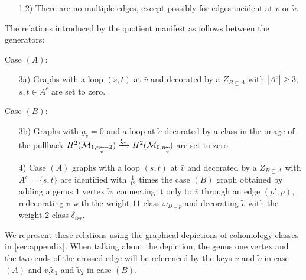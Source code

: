 \begin{enumerate}
    \item[1.2)] There are no multiple edges, except possibly for edges incident at $\bar{v}$ or $\tilde{v}$.
\end{enumerate}

The relations introduced by the quotient manifest as follows between the generators:\\
\begin{minipage}[t]{0.44\textwidth}
Case $(A)$:
\begin{enumerate}
    \item[3a)] Graphs with a loop $(s,t)$ at $\bar{v}$ and decorated by a $Z_{B\subseteq A}$ with $|A^c|\geq 3$, $s,t\in A^c$ are set to zero.
\end{enumerate}
\end{minipage}
\begin{minipage}[t]{0.56\textwidth}
Case $(B)$:
\begin{enumerate}
    \item[3b)] Graphs with $g_{\tilde{v}}=0$ and a loop at $\tilde{v}$ decorated by a class in the image of the pullback $H^2(\overline{\mathcal{M}}_{1,n_{\widetilde{v}}-2})\xrightarrow{\xi_{*}} H^2(\overline{\mathcal{M}}_{0,n_{\widetilde{v}}})$ are set to zero. 
\end{enumerate}
\end{minipage}%
\begin{enumerate}
    \item[4)] Case $(A)$ graphs with a loop $(s,t)$ at $\bar{v}$ and decorated by a $Z_{B\subseteq A}$ with $A^c=\{s,t\}$ are identified with $\frac{1}{12}$ times the case $(B)$ graph obtained by adding a genus $1$ vertex $\tilde{v}$, connecting it only to $\bar{v}$ through an edge $(p',p)$, redecorating $\bar{v}$ with the weight $11$ class $\omega_{B\sqcup p}$ and decorating $\tilde{v}$ with the weight $2$ class $\delta_{irr}$.
\end{enumerate}

We represent these relations using the graphical depictions of cohomology classes in \ref{sec:appendix}. When talking about the depiction, the genus one vertex and the two ends of the crossed edge will be referenced by the keys $\bar{v}$ and $\tilde{v}$ in case $(A)$ and  $\bar{v}$,$\tilde{v}_1$ and $\tilde{v}_2$ in case $(B)$.

